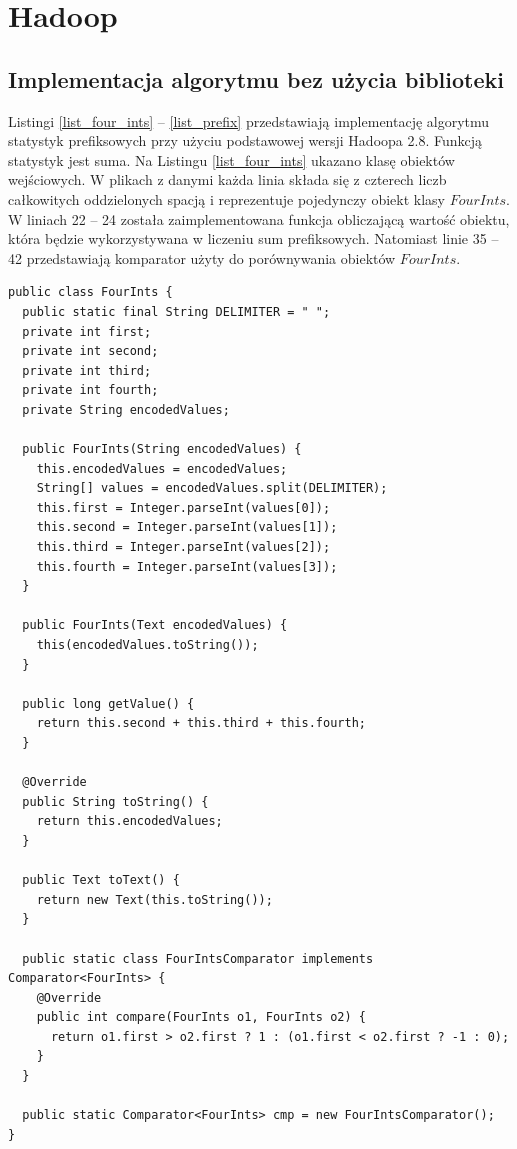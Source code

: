 \documentclass[magisterska]{pracamgr}
\begin{document}
\section{Hadoop} \label{hadoop}

\subsection{Implementacja algorytmu bez użycia biblioteki} \label{hbub}

Listingi \ref{list_four_ints} -- \ref{list_prefix} przedstawiają implementację algorytmu statystyk prefiksowych przy użyciu podstawowej wersji Hadoopa 2.8. Funkcją statystyk jest suma. Na Listingu \ref{list_four_ints} ukazano klasę obiektów wejściowych. W plikach z danymi każda linia składa się z czterech liczb całkowitych oddzielonych spacją i reprezentuje pojedynczy obiekt klasy \(FourInts\). W liniach 22 -- 24 została zaimplementowana funkcja obliczającą wartość obiektu, która będzie wykorzystywana w liczeniu sum prefiksowych. Natomiast linie 35 -- 42 przedstawiają komparator użyty do porównywania obiektów \(FourInts\).

\begin{lstlisting}[language=SmallJava,firstnumber=1,label=list_four_ints,caption=Klasa danych wejściowych do algorytmu statystyk prefiksowych]
public class FourInts {
  public static final String DELIMITER = " ";
  private int first;
  private int second;
  private int third;
  private int fourth;
  private String encodedValues;

  public FourInts(String encodedValues) {
    this.encodedValues = encodedValues;
    String[] values = encodedValues.split(DELIMITER);
    this.first = Integer.parseInt(values[0]);
    this.second = Integer.parseInt(values[1]);
    this.third = Integer.parseInt(values[2]);
    this.fourth = Integer.parseInt(values[3]);
  }

  public FourInts(Text encodedValues) {
    this(encodedValues.toString());
  }

  public long getValue() {
    return this.second + this.third + this.fourth;
  }

  @Override
  public String toString() {
    return this.encodedValues;
  }

  public Text toText() {
    return new Text(this.toString());
  }

  public static class FourIntsComparator implements Comparator<FourInts> {
    @Override
    public int compare(FourInts o1, FourInts o2) {
      return o1.first > o2.first ? 1 : (o1.first < o2.first ? -1 : 0);
    }
  }

  public static Comparator<FourInts> cmp = new FourIntsComparator();
}
\end{lstlisting}
\end{document}
